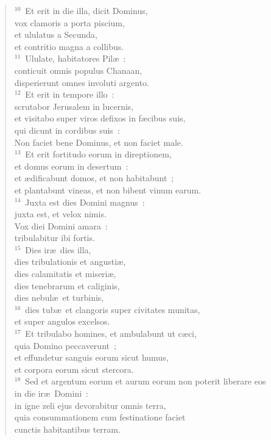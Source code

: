 \begin{flushleft}
\begin{verse}
${}^{10}$~Et erit in die illa, dicit Dominus,\\ vox clamoris a porta piscium,\\ et ululatus a Secunda,\\ et contritio magna a collibus.\\
${}^{11}$~Ululate, habitatores Pil\ae~:\\ conticuit omnis populus Chanaan,\\ disperierunt omnes involuti argento.\\
${}^{12}$~Et erit in tempore illo~:\\ scrutabor Jerusalem in lucernis,\\ et visitabo super viros defixos in f\ae cibus suis,\\ qui dicunt in cordibus suis~:\\ Non faciet bene Dominus, et non faciet male.\\
${}^{13}$~Et erit fortitudo eorum in direptionem,\\ et domus eorum in desertum~:\\ et \ae dificabunt domos, et non habitabunt~;\\ et plantabunt vineas, et non bibent vinum earum.\\
${}^{14}$~Juxta est dies Domini magnus~:\\ juxta est, et velox nimis.\\ Vox diei Domini amara~:\\ tribulabitur ibi fortis.\\
${}^{15}$~Dies ir\ae\ dies illa,\\ dies tribulationis et angusti\ae ,\\ dies calamitatis et miseri\ae ,\\ dies tenebrarum et caliginis,\\ dies nebul\ae\ et turbinis,\\
${}^{16}$~dies tub\ae\ et clangoris super civitates munitas,\\ et super angulos excelsos.\\
${}^{17}$~Et tribulabo homines, et ambulabunt ut c\ae ci,\\ quia Domino peccaverunt~;\\ et effundetur sanguis eorum sicut humus,\\ et corpora eorum sicut stercora.\\
${}^{18}$~Sed et argentum eorum et aurum eorum non poterit liberare eos\\ in die ir\ae\ Domini~:\\ in igne zeli ejus devorabitur omnis terra,\\ quia consummationem cum festinatione faciet\\ cunctis habitantibus terram.\end{verse}\end{flushleft}


